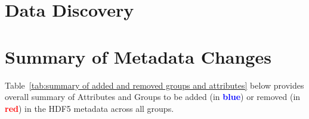 \documentclass[a4paper,10pt,bibtotoc]{scrartcl}
\begin{document}
\clearpage
\section{Data Discovery}
\label{sec:data discovery}

\clearpage
\clearpage
\section{Summary of Metadata Changes}
\label{sec:summary of metadata changes}

Table~\ref{tab:summary of added and removed groups and attributes} below provides overall summary of Attributes and Groups to be added (in \textcolor{blue}{\bf blue})
or removed (in \textcolor{red}{\bf red}) in the HDF5 metadata across all groups.
\end{document}
